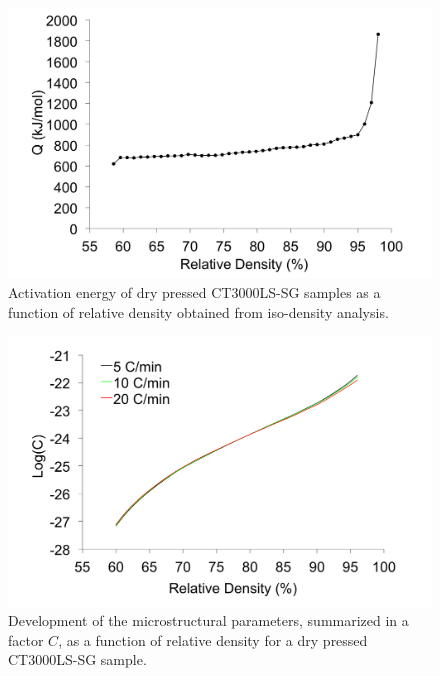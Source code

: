 \newpage
\begin{figure}[H]
	\centering
	\includegraphics[width=\textwidth]{Chapter-6/Figures/Figure9.png}
	\caption{Activation energy of dry pressed CT3000LS-SG samples as a function of relative density obtained from iso-density analysis.}
	\label{Ch6-figure:Figure9}
\end{figure}

\newpage
\begin{figure}[H]
	\centering
	\includegraphics[width=\textwidth]{Chapter-6/Figures/Figure10.png}
	\caption{Development of the microstructural parameters, summarized in a factor $C$, as a function of relative density for a dry pressed CT3000LS-SG sample.}
	\label{Ch6-figure:Figure10}
\end{figure}

